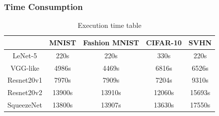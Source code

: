 \documentclass{beamer}
\begin{document}
\begin{frame}\frametitle{Time Consumption}
\begin{table}
	\centering
	\begin{tabular}{ |c|c|c|c|c| } 
		\hline
		& MNIST & Fashion MNIST & CIFAR-10 & SVHN \\ 
		\hline
		LeNet-5	& 220s & 220s & 330s & 220s\\
		\hline 
		VGG-like & 4986s	& 4469s & 6816s & 6526s\\ 
		\hline
		Resnet20v1 & 7970s & 7909s	& 7204s & 9310s\\ 
		\hline
		Resnet20v2 & 13900s & 	13910s & 	12060s & 	15693s\\
		\hline
		SqueezeNet & 13800s & 	13907s & 	13630s & 	17550s\\
		\hline
	\end{tabular}
	\caption{Execution time table}
	\label{tab:times}
\end{table}
\end{frame}
\end{document}
